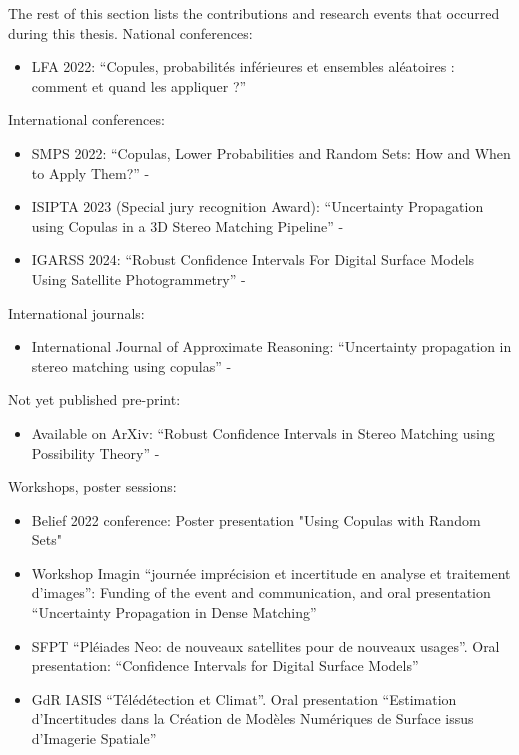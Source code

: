 The rest of this section lists the contributions and research events that occurred during this thesis.
\newline
\noindent National conferences:
\begin{itemize}
    \item LFA 2022: ``Copules, probabilités inférieures et ensembles aléatoires : comment et quand les appliquer ?''  \cite{malinowski_copules_2022}
\end{itemize}
International conferences:
\begin{itemize}
    \item SMPS 2022: ``Copulas, Lower Probabilities and Random Sets: How and When to Apply Them?'' - \cite{malinowski_copulas_2022}
    \item ISIPTA 2023 (Special jury recognition Award): ``Uncertainty Propagation using Copulas in a 3D Stereo Matching Pipeline'' -  \cite{malinowski_uncertainty_2023}
    \item IGARSS 2024: ``Robust Confidence Intervals For Digital Surface Models Using Satellite Photogrammetry'' -  \cite{malinowski_robust_2024}
\end{itemize}
International journals:
\begin{itemize}
    \item International Journal of Approximate Reasoning: ``Uncertainty propagation in stereo matching using copulas'' -  \cite{malinowski_uncertainty_2024}
\end{itemize}
Not yet published pre-print:
\begin{itemize}
    \item Available on ArXiv: ``Robust Confidence Intervals in Stereo Matching using Possibility Theory'' - \cite{malinowski_robust_2024-1}
\end{itemize}
Workshops, poster sessions:
\begin{itemize}
    \item Belief 2022 conference: Poster presentation "Using Copulas with Random Sets"
    \item Workshop Imagin ``journée imprécision et incertitude en analyse et traitement d'images'': Funding of the event and communication, and oral presentation ``Uncertainty Propagation in Dense Matching''
    \item SFPT ``Pléiades Neo: de nouveaux satellites pour de nouveaux usages''. Oral presentation: ``Confidence Intervals for Digital Surface Models''
    \item GdR IASIS ``Télédétection et Climat''. Oral presentation ``Estimation d'Incertitudes dans la Création de Modèles Numériques de Surface issus d'Imagerie Spatiale''
\end{itemize}

\clearpage
